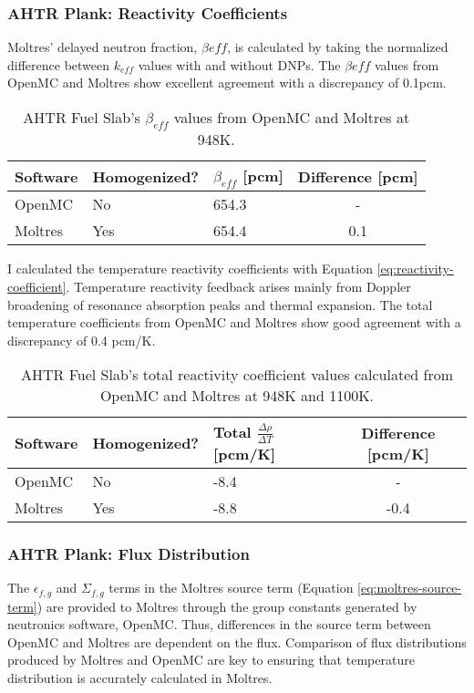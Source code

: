 \subsubsection{AHTR Plank: Reactivity Coefficients}
Moltres' delayed neutron fraction, $\beta{eff}$, is calculated by taking the 
normalized difference between $k_{eff}$ values with and without DNPs. 
The  $\beta{eff}$ values from OpenMC and Moltres show excellent 
agreement with a discrepancy of 0.1pcm. 
\begin{table}[]
    \centering
    \onehalfspacing
    \caption{AHTR Fuel Slab's $\beta_{eff}$ values from OpenMC and Moltres at 948K.}
	\label{tab:betaeff_ahtr_moltres}
    \footnotesize
    \begin{tabular}{lllc}
    \hline 
    \textbf{Software}& \textbf{Homogenized?}& \textbf{$\beta_{eff}$ [pcm]} 
    & \textbf{Difference [pcm]}  \\
    \hline 
    OpenMC & No &  654.3 & - \\ 
    Moltres & Yes & 654.4 & 0.1\\ 
    \hline
    \end{tabular}
\end{table}
I calculated the temperature reactivity coefficients with Equation 
\ref{eq:reactivity-coefficient}.
Temperature reactivity feedback arises mainly from Doppler broadening of 
resonance absorption peaks and thermal expansion.
The total temperature coefficients from OpenMC and Moltres show good 
agreement with a discrepancy of 0.4 pcm/K.
\begin{table}[]
    \centering
    \onehalfspacing
    \caption{AHTR Fuel Slab's total reactivity coefficient values calculated from 
    OpenMC and Moltres at 948K and 1100K.}
	\label{tab:reactivity_ahtr_moltres}
    \footnotesize
    \begin{tabular}{lllc}
    \hline 
    \textbf{Software}& \textbf{Homogenized?}& \textbf{Total $\frac{\Delta \rho}{\Delta T}$ [pcm/K]} 
    & \textbf{Difference [pcm/K]}  \\
    \hline 
    OpenMC & No &  -8.4 & - \\ 
    Moltres & Yes & -8.8 & -0.4\\ 
    \hline
    \end{tabular}
\end{table}

\subsubsection{AHTR Plank: Flux Distribution}
The $\epsilon_{f,g}$ and $\Sigma_{f,g}$ terms in the Moltres source term (Equation 
\ref{eq:moltres-source-term}) are provided to Moltres through 
the group constants generated by neutronics software, OpenMC.
Thus, differences in the source term between OpenMC and Moltres are dependent on 
the flux. 
Comparison of flux distributions produced by Moltres and OpenMC are key to 
ensuring that temperature distribution is accurately calculated in Moltres.

